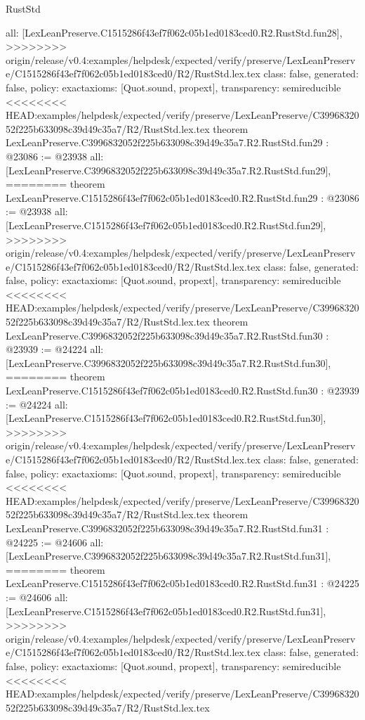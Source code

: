 \begin{lexlean}{RustStd}
\begin{coremodule}
{\begin{coremodule}
{{{{{{{{{{{{{{{{{{{{{{{{{{{{{{{{  all: [LexLeanPreserve.C1515286f43ef7f062c05b1ed0183ced0.R2.RustStd.fun28],
>>>>>>>> origin/release/v0.4:examples/helpdesk/expected/verify/preserve/LexLeanPreserve/C1515286f43ef7f062c05b1ed0183ced0/R2/RustStd.lex.tex
  class: false,
  generated: false,
  policy: exact{axioms: [Quot.sound, propext]},
  transparency: semireducible
}
<<<<<<<< HEAD:examples/helpdesk/expected/verify/preserve/LexLeanPreserve/C3996832052f225b633098c39d49c35a7/R2/RustStd.lex.tex
theorem LexLeanPreserve.C3996832052f225b633098c39d49c35a7.R2.RustStd.fun29 : @23086 := @23938 {
  all: [LexLeanPreserve.C3996832052f225b633098c39d49c35a7.R2.RustStd.fun29],
========
theorem LexLeanPreserve.C1515286f43ef7f062c05b1ed0183ced0.R2.RustStd.fun29 : @23086 := @23938 {
  all: [LexLeanPreserve.C1515286f43ef7f062c05b1ed0183ced0.R2.RustStd.fun29],
>>>>>>>> origin/release/v0.4:examples/helpdesk/expected/verify/preserve/LexLeanPreserve/C1515286f43ef7f062c05b1ed0183ced0/R2/RustStd.lex.tex
  class: false,
  generated: false,
  policy: exact{axioms: [Quot.sound, propext]},
  transparency: semireducible
}
<<<<<<<< HEAD:examples/helpdesk/expected/verify/preserve/LexLeanPreserve/C3996832052f225b633098c39d49c35a7/R2/RustStd.lex.tex
theorem LexLeanPreserve.C3996832052f225b633098c39d49c35a7.R2.RustStd.fun30 : @23939 := @24224 {
  all: [LexLeanPreserve.C3996832052f225b633098c39d49c35a7.R2.RustStd.fun30],
========
theorem LexLeanPreserve.C1515286f43ef7f062c05b1ed0183ced0.R2.RustStd.fun30 : @23939 := @24224 {
  all: [LexLeanPreserve.C1515286f43ef7f062c05b1ed0183ced0.R2.RustStd.fun30],
>>>>>>>> origin/release/v0.4:examples/helpdesk/expected/verify/preserve/LexLeanPreserve/C1515286f43ef7f062c05b1ed0183ced0/R2/RustStd.lex.tex
  class: false,
  generated: false,
  policy: exact{axioms: [Quot.sound, propext]},
  transparency: semireducible
}
<<<<<<<< HEAD:examples/helpdesk/expected/verify/preserve/LexLeanPreserve/C3996832052f225b633098c39d49c35a7/R2/RustStd.lex.tex
theorem LexLeanPreserve.C3996832052f225b633098c39d49c35a7.R2.RustStd.fun31 : @24225 := @24606 {
  all: [LexLeanPreserve.C3996832052f225b633098c39d49c35a7.R2.RustStd.fun31],
========
theorem LexLeanPreserve.C1515286f43ef7f062c05b1ed0183ced0.R2.RustStd.fun31 : @24225 := @24606 {
  all: [LexLeanPreserve.C1515286f43ef7f062c05b1ed0183ced0.R2.RustStd.fun31],
>>>>>>>> origin/release/v0.4:examples/helpdesk/expected/verify/preserve/LexLeanPreserve/C1515286f43ef7f062c05b1ed0183ced0/R2/RustStd.lex.tex
  class: false,
  generated: false,
  policy: exact{axioms: [Quot.sound, propext]},
  transparency: semireducible
}
<<<<<<<< HEAD:examples/helpdesk/expected/verify/preserve/LexLeanPreserve/C3996832052f225b633098c39d49c35a7/R2/RustStd.lex.tex
}}}}}}}}}}}}}}}}}}}}}}}}}}}}}}}}}}
\end{coremodule}}
\end{coremodule}
\end{lexlean}
